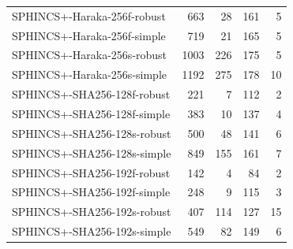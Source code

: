 \documentclass[a4paper,12pt]{article}
\begin{document}
\begin{table}[]
\begin{tabular}{@{}lrrrr@{}}
SPHINCS+-Haraka-256f-robust   & 663                                     & 28                       & 161                                       & 5                         \\
SPHINCS+-Haraka-256f-simple   & 719                                      & 21                         & 165                                       & 5                          \\
SPHINCS+-Haraka-256s-robust   & 1003                                      & 226                       & 175                                       & 5                         \\
SPHINCS+-Haraka-256s-simple   & 1192                                    & 275                        & 178                                       & 10                         \\ \hline
SPHINCS+-SHA256-128f-robust   & 221                                     & 7                        & 112                                       & 2                         \\
SPHINCS+-SHA256-128f-simple   & 383                                     & 10                        & 137                                       & 4                       \\
SPHINCS+-SHA256-128s-robust   & 500                                         & 48                        & 141                                       & 6                          \\
SPHINCS+-SHA256-128s-simple   & 849                                         & 155                        & 161                                       & 7                         \\
SPHINCS+-SHA256-192f-robust   & 142                                     & 4                          & 84                                        & 2                       \\
SPHINCS+-SHA256-192f-simple   & 248                                     & 9                          & 115                                       & 3                         \\
SPHINCS+-SHA256-192s-robust   & 407                                     & 114                        & 127                                       & 15                        \\
SPHINCS+-SHA256-192s-simple   & 549                                     & 82                        & 149                                       & 6                          \\

\end{tabular}
\end{table}
\end{document}
